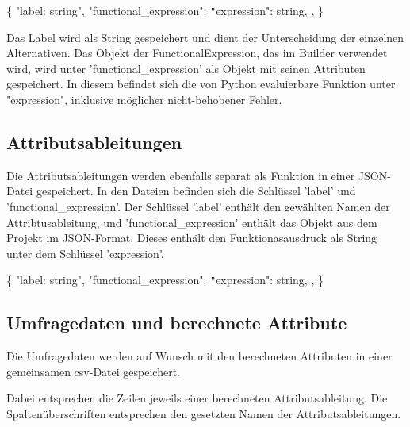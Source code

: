 \documentclass{article}
\begin{document}
\newline
\{ \newline
    "label: string", \newline
    "functional\_expression": {\newline
        \texttt{"}expression": string, \newline
    }, \newline
\} \newline
\newline

Das Label wird als String gespeichert und dient der Unterscheidung der einzelnen Alternativen. Das Objekt der FunctionalExpression, das im Builder verwendet wird, wird unter 'functional\_expression' als Objekt mit seinen Attributen gespeichert. In diesem befindet sich die von Python evaluierbare Funktion unter "expression", inklusive möglicher nicht-behobener Fehler.

\subsection{Attributsableitungen}
Die Attributsableitungen werden ebenfalls separat als Funktion in einer JSON-Datei gespeichert. In den Dateien befinden sich die Schlüssel 'label' und 'functional\_expression'. Der Schlüssel 'label' enthält den gewählten Namen der Attribtusableitung, und 'functional\_expression' enthält das Objekt aus dem Projekt im JSON-Format. Dieses enthält den Funktionasausdruck als String unter dem Schlüssel 'expression'.

\newline
\{ \newline
    "label: string", \newline
    "functional\_expression": {\newline
        \texttt{"}expression": string, \newline
    }, \newline
\} \newline
\newline


\subsection{Umfragedaten und berechnete Attribute}
Die Umfragedaten werden auf Wunsch mit den berechneten Attributen in einer gemeinsamen csv-Datei gespeichert. 

Dabei entsprechen die Zeilen jeweils einer berechneten Attributsableitung. Die Spaltenüberschriften entsprechen den gesetzten Namen der Attributsableitungen. 
\end{document}
